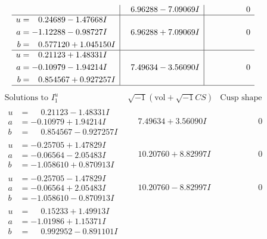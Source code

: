 \documentclass[1p]{elsarticle_modified}
\theoremstyle{definition}
\newcommand{\I}{\sqrt{-1}}
\begin{document}
$$\begin{array}{c|c|c}
 & \phantom{-}6.96288 - 7.09069 I & \phantom{-0.000000 } 0 \\ \hline\begin{aligned}
u &= \phantom{-}0.24689 - 1.47668 I \\
a &= -1.12288 - 0.98727 I \\
b &= \phantom{-}0.577120 + 1.045150 I\end{aligned}
 & \phantom{-}6.96288 + 7.09069 I & \phantom{-0.000000 } 0 \\ \hline\begin{aligned}
u &= \phantom{-}0.21123 + 1.48331 I \\
a &= -0.10979 - 1.94214 I \\
b &= \phantom{-}0.854567 + 0.927257 I\end{aligned}
 & \phantom{-}7.49634 - 3.56090 I & \phantom{-0.000000 } 0\\
 \hline 
 \end{array}$$\newpage$$\begin{array}{c|c|c}  
\text{Solutions to }I^u_{1}& \I (\text{vol} + \sqrt{-1}CS) & \text{Cusp shape}\\
 \hline 
\begin{aligned}
u &= \phantom{-}0.21123 - 1.48331 I \\
a &= -0.10979 + 1.94214 I \\
b &= \phantom{-}0.854567 - 0.927257 I\end{aligned}
 & \phantom{-}7.49634 + 3.56090 I & \phantom{-0.000000 } 0 \\ \hline\begin{aligned}
u &= -0.25705 + 1.47829 I \\
a &= -0.06564 - 2.05483 I \\
b &= -1.058610 + 0.870913 I\end{aligned}
 & \phantom{-}10.20760 + 8.82997 I & \phantom{-0.000000 } 0 \\ \hline\begin{aligned}
u &= -0.25705 - 1.47829 I \\
a &= -0.06564 + 2.05483 I \\
b &= -1.058610 - 0.870913 I\end{aligned}
 & \phantom{-}10.20760 - 8.82997 I & \phantom{-0.000000 } 0 \\ \hline\begin{aligned}
u &= \phantom{-}0.15233 + 1.49913 I \\
a &= -1.01986 + 1.15371 I \\
b &= \phantom{-}0.992952 - 0.891101 I\end{aligned}

\end{array}$$
\end{document}
